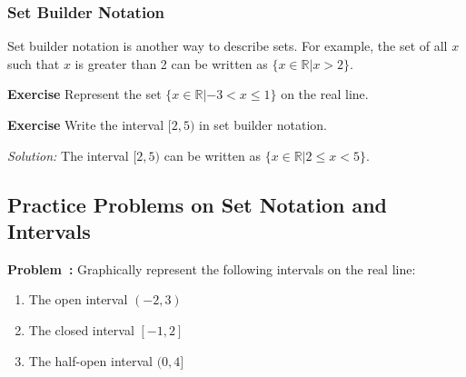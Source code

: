 \documentclass[a4paper,12pt]{book}
\newenvironment{exercise}[1][]
  {\par\medskip\noindent\textbf{Exercise #1} \rmfamily}
  {\medskip}
\newcounter{problem}
\newenvironment{problem}[1][\theproblem]
{\refstepcounter{problem}\par\medskip\noindent\textbf{Problem~#1:} \rmfamily}{\medskip}
\newenvironment{solution}[1][]
{\par\noindent\textit{Solution:} \rmfamily}{\medskip}
\begin{document}
\begin{center}
\end{center}


\subsubsection{Set Builder Notation}
Set builder notation is another way to describe sets. For example, the set of all \( x \) such that \( x \) is greater than 2 can be written as \( \{ x \in \mathbb{R} | x > 2 \} \).


\begin{exercise}
Represent the set \( \{ x \in \mathbb{R} | -3 < x \leq 1 \} \) on the real line.
\end{exercise}


\begin{exercise}
Write the interval \( [2, 5) \) in set builder notation.
\end{exercise}


\begin{solution}
The interval \( [2, 5) \) can be written as \( \{ x \in \mathbb{R} | 2 \leq x < 5 \} \).
\end{solution}




\subsection*{Practice Problems on Set Notation and Intervals}


\begin{problem}
Graphically represent the following intervals on the real line:
\begin{enumerate}[label=(\alph*)]
    \item The open interval \( (-2, 3) \)
    \item The closed interval \( [-1, 2] \)
    \item The half-open interval \( (0, 4] \)
\end{enumerate}
\end{problem}
\end{document}
